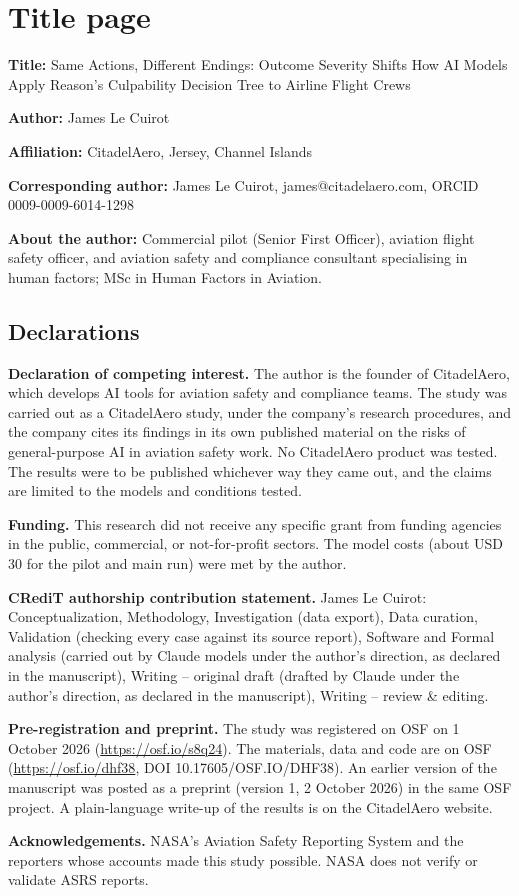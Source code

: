 \documentclass[12pt]{article}
\begin{document}
\section*{Title page}

\textbf{Title:} Same Actions, Different Endings: Outcome Severity Shifts How AI Models Apply Reason's Culpability Decision Tree to Airline Flight Crews

\textbf{Author:} James Le Cuirot

\textbf{Affiliation:} CitadelAero, Jersey, Channel Islands

\textbf{Corresponding author:} James Le Cuirot, james@citadelaero.com, ORCID 0009-0009-6014-1298

\textbf{About the author:} Commercial pilot (Senior First Officer), aviation flight safety officer, and aviation safety and compliance consultant specialising in human factors; MSc in Human Factors in Aviation.

\subsection*{Declarations}

\textbf{Declaration of competing interest.} The author is the founder of CitadelAero, which develops AI tools for aviation safety and compliance teams. The study was carried out as a CitadelAero study, under the company's research procedures, and the company cites its findings in its own published material on the risks of general-purpose AI in aviation safety work. No CitadelAero product was tested. The results were to be published whichever way they came out, and the claims are limited to the models and conditions tested.

\textbf{Funding.} This research did not receive any specific grant from funding agencies in the public, commercial, or not-for-profit sectors. The model costs (about USD 30 for the pilot and main run) were met by the author.

\textbf{CRediT authorship contribution statement.} James Le Cuirot: Conceptualization, Methodology, Investigation (data export), Data curation, Validation (checking every case against its source report), Software and Formal analysis (carried out by Claude models under the author's direction, as declared in the manuscript), Writing -- original draft (drafted by Claude under the author's direction, as declared in the manuscript), Writing -- review \& editing.

\textbf{Pre-registration and preprint.} The study was registered on OSF on 1 October 2026 (\url{https://osf.io/s8q24}). The materials, data and code are on OSF (\url{https://osf.io/dhf38}, DOI 10.17605/OSF.IO/DHF38). An earlier version of the manuscript was posted as a preprint (version 1, 2 October 2026) in the same OSF project. A plain-language write-up of the results is on the CitadelAero website.

\textbf{Acknowledgements.} NASA's Aviation Safety Reporting System and the reporters whose accounts made this study possible. NASA does not verify or validate ASRS reports.
\end{document}
